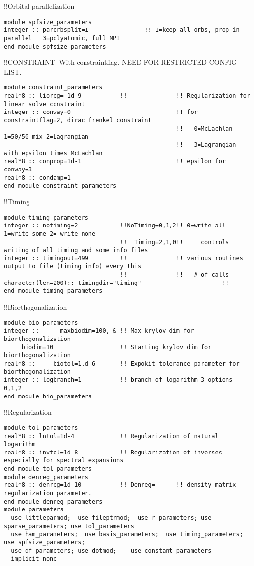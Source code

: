 !!{\large \quad Orbital parallelization}
\begin{verbatim}
module spfsize_parameters
integer :: parorbsplit=1                !! 1=keep all orbs, prop in parallel   3=polyatomic, full MPI
end module spfsize_parameters
\end{verbatim}
!!{\large \quad CONSTRAINT: With constraintflag. NEED FOR RESTRICTED CONFIG LIST.}
\begin{verbatim}
module constraint_parameters
real*8 :: lioreg= 1d-9           !!              !! Regularization for linear solve constraint
integer :: conway=0                              !! for constraintflag=2, dirac frenkel constraint
                                                 !!   0=McLachlan 1=50/50 mix 2=Lagrangian
                                                 !!   3=Lagrangian with epsilon times McLachlan
real*8 :: conprop=1d-1                           !! epsilon for conway=3
real*8 :: condamp=1
end module constraint_parameters
\end{verbatim}
!!{\large \quad Timing}
\begin{verbatim}
module timing_parameters
integer :: notiming=2            !!NoTiming=0,1,2!! 0=write all 1=write some 2= write none
                                 !!  Timing=2,1,0!!     controls writing of all timing and some info files
integer :: timingout=499         !!              !! various routines output to file (timing info) every this 
                                 !!              !!   # of calls
character(len=200):: timingdir="timing"                       !!
end module timing_parameters
\end{verbatim}
!!{\large \quad Biorthogonalization }
\begin{verbatim}
module bio_parameters
integer ::      maxbiodim=100, & !! Max krylov dim for biorthogonalization
     biodim=10                   !! Starting krylov dim for biorthogonalization
real*8 ::     biotol=1.d-6       !! Expokit tolerance parameter for biorthogonalization
integer :: logbranch=1           !! branch of logarithm 3 options 0,1,2
end module bio_parameters
\end{verbatim}
!!{\large \quad Regularization}
\begin{verbatim}
module tol_parameters
real*8 :: lntol=1d-4             !! Regularization of natural logarithm
real*8 :: invtol=1d-8            !! Regularization of inverses especially for spectral expansions
end module tol_parameters
module denreg_parameters
real*8 :: denreg=1d-10           !! Denreg=      !! density matrix regularization parameter.
end module denreg_parameters
module parameters
  use littleparmod;  use fileptrmod;  use r_parameters; use sparse_parameters; use tol_parameters
  use ham_parameters;  use basis_parameters;  use timing_parameters; use spfsize_parameters;
  use df_parameters; use dotmod;    use constant_parameters
  implicit none
\end{verbatim}
